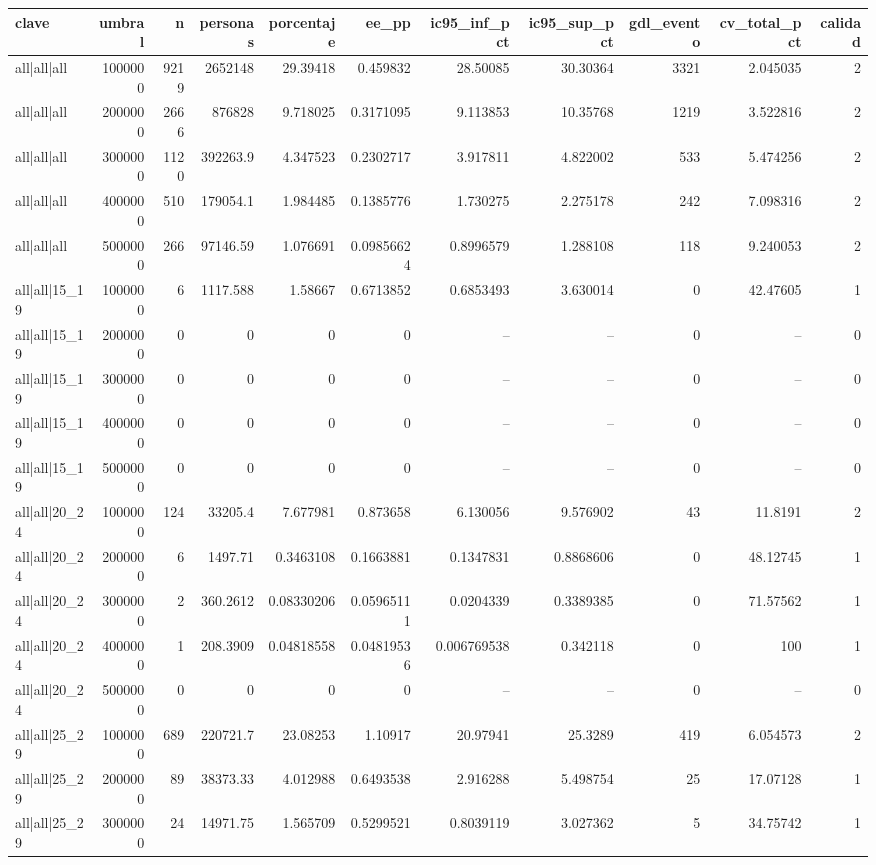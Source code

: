 \begin{tabular}{lrrrrrrrrrr}
\toprule
clave & umbral & n & personas & porcentaje & ee\_pp & ic95\_inf\_pct & ic95\_sup\_pct & gdl\_evento & cv\_total\_pct & calidad \\
\midrule
all|all|all & 1000000 & 9219 & 2652148 & 29.39418 & 0.459832 & 28.50085 & 30.30364 & 3321 & 2.045035 & 2 \\
all|all|all & 2000000 & 2666 & 876828 & 9.718025 & 0.3171095 & 9.113853 & 10.35768 & 1219 & 3.522816 & 2 \\
all|all|all & 3000000 & 1120 & 392263.9 & 4.347523 & 0.2302717 & 3.917811 & 4.822002 & 533 & 5.474256 & 2 \\
all|all|all & 4000000 & 510 & 179054.1 & 1.984485 & 0.1385776 & 1.730275 & 2.275178 & 242 & 7.098316 & 2 \\
all|all|all & 5000000 & 266 & 97146.59 & 1.076691 & 0.09856624 & 0.8996579 & 1.288108 & 118 & 9.240053 & 2 \\
all|all|15\_19 & 1000000 & 6 & 1117.588 & 1.58667 & 0.6713852 & 0.6853493 & 3.630014 & 0 & 42.47605 & 1 \\
all|all|15\_19 & 2000000 & 0 & 0 & 0 & 0 & -- & -- & 0 & -- & 0 \\
all|all|15\_19 & 3000000 & 0 & 0 & 0 & 0 & -- & -- & 0 & -- & 0 \\
all|all|15\_19 & 4000000 & 0 & 0 & 0 & 0 & -- & -- & 0 & -- & 0 \\
all|all|15\_19 & 5000000 & 0 & 0 & 0 & 0 & -- & -- & 0 & -- & 0 \\
all|all|20\_24 & 1000000 & 124 & 33205.4 & 7.677981 & 0.873658 & 6.130056 & 9.576902 & 43 & 11.8191 & 2 \\
all|all|20\_24 & 2000000 & 6 & 1497.71 & 0.3463108 & 0.1663881 & 0.1347831 & 0.8868606 & 0 & 48.12745 & 1 \\
all|all|20\_24 & 3000000 & 2 & 360.2612 & 0.08330206 & 0.05965111 & 0.0204339 & 0.3389385 & 0 & 71.57562 & 1 \\
all|all|20\_24 & 4000000 & 1 & 208.3909 & 0.04818558 & 0.04819536 & 0.006769538 & 0.342118 & 0 & 100 & 1 \\
all|all|20\_24 & 5000000 & 0 & 0 & 0 & 0 & -- & -- & 0 & -- & 0 \\
all|all|25\_29 & 1000000 & 689 & 220721.7 & 23.08253 & 1.10917 & 20.97941 & 25.3289 & 419 & 6.054573 & 2 \\
all|all|25\_29 & 2000000 & 89 & 38373.33 & 4.012988 & 0.6493538 & 2.916288 & 5.498754 & 25 & 17.07128 & 1 \\
all|all|25\_29 & 3000000 & 24 & 14971.75 & 1.565709 & 0.5299521 & 0.8039119 & 3.027362 & 5 & 34.75742 & 1 \\

\end{tabular}
